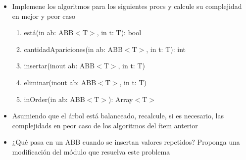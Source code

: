 \begin{itemize}
	\item Implemene los algoritmos para los siguientes procs y calcule su complejidad en mejor y peor caso
	      \begin{enumerate}
		      \item está(in ab: ABB$<$T$>$, in t: T): bool
		      \item cantidadApariciones(in ab: ABB$<$T$>$, in t: T): int
		      \item insertar(inout ab: ABB$<$T$>$, in t: T)
		      \item eliminar(inout ab: ABB$<$T$>$, in t: T)
		      \item inOrder(in ab: ABB$<$T$>$): Array$<$T$>$
	      \end{enumerate}

	\item Asumiendo que el árbol está balanceado, recalcule, si es necesario, las complejidads en peor caso de los algoritmos del ítem anterior
	\item ¿Qué pasa en un ABB cuando se insertan valores repetidos? Proponga una modificación del módulo que resuelva este problema
\end{itemize}

